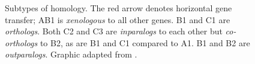 \begin{figure}[h]
	\centering
	\def\svgwidth{0.8\textwidth}
	
	\caption[Orthology, paralogy, and xenology]{Subtypes of homology. The red
		arrow denotes horizontal gene transfer; AB1 is \emph{xenologous} to all
		other genes. B1 and C1 are \emph{orthologs}. Both C2 and C3 are
		\emph{inparalogs} to each other but \emph{co-orthologs} to B2, as are B1 and
		C1 compared to A1. B1 and B2 are \emph{outparalogs}. Graphic adapted from
		\citet{fitch2000}.
	}
	\label{fig:orthology}
\end{figure}
